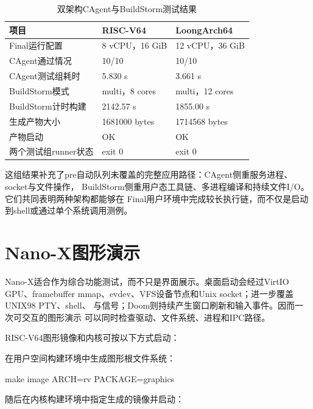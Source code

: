 \begin{table}[htbp]
  \centering
  \caption{双架构CAgent与BuildStorm测试结果}
  \label{tab:dual-arch-workloads}
  \begin{tabularx}{\textwidth}{L{4.4cm}C{4.1cm}C{4.1cm}}
    \toprule
    项目 & RISC-V64 & LoongArch64 \\
    \midrule
    Final运行配置 & 8 vCPU，16 GiB & 12 vCPU，36 GiB \\
    CAgent通过情况 & 10/10 & 10/10 \\
    CAgent测试组耗时 & 5.830 s & 3.661 s \\
    BuildStorm模式 & multi，8 cores & multi，12 cores \\
    BuildStorm计时构建 & 2142.57 s & 1855.00 s \\
    生成产物大小 & 1681000 bytes & 1714568 bytes \\
    产物启动 & OK & OK \\
    两个测试组runner状态 & exit 0 & exit 0 \\
    \bottomrule
  \end{tabularx}
\end{table}

这组结果补充了pre自动队列未覆盖的完整应用路径：CAgent侧重服务进程、socket与文件操作，
BuildStorm侧重用户态工具链、多进程编译和持续文件I/O。它们共同表明两种架构都能够在
Final用户环境中完成较长执行链，而不仅是启动到shell或通过单个系统调用测例。

\FloatBarrier
\section{Nano-X图形演示}

Nano-X适合作为综合功能测试，而不只是界面展示。桌面启动会经过VirtIO GPU、framebuffer
mmap、evdev、VFS设备节点和Unix socket；进一步覆盖UNIX98 PTY、shell、
与信号；Doom则持续产生窗口刷新和输入事件。因而一次可交互的图形演示
可以同时检查驱动、文件系统、进程和IPC路径。

RISC-V64图形镜像和内核可按以下方式启动：

在用户空间构建环境中生成图形根文件系统：

\begin{bashcode}
make image ARCH=rv PACKAGE=graphics
\end{bashcode}

随后在内核构建环境中指定生成的镜像并启动：


